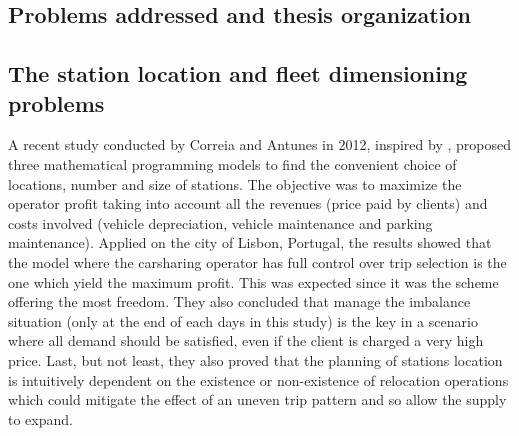 \begin{bibunit}[ieeetr]
\section{Problems addressed and thesis organization}


\subsection{The station location and fleet dimensioning problems}
A recent study conducted by Correia and Antunes \cite{correia_optimization_2012} in 2012, inspired by \cite{fan_carsharing_2008}, proposed three
mathematical programming models to find the convenient choice of locations, number and size
of stations.
The objective was to maximize the operator profit taking into account all the revenues (price paid by clients) and costs involved (vehicle depreciation, vehicle maintenance
and parking maintenance).
Applied on the city of Lisbon, Portugal, the results showed that the model where the carsharing operator has full control over trip selection is the one which yield the maximum profit.
This was expected since it was the scheme offering the most freedom.
They also concluded that manage the imbalance situation (only at the end of each days in this study) is the key in a scenario where all demand should be satisfied, even if the client is charged a very high price.
Last, but not least, they also proved that the planning of stations location is intuitively dependent on the existence or non-existence of relocation operations which could
mitigate the effect of an uneven trip pattern and so allow the supply to expand.


\newpage
{}
\renewcommand{\bibname}{Bibliography of chapter \thechapter}
\end{bibunit}
